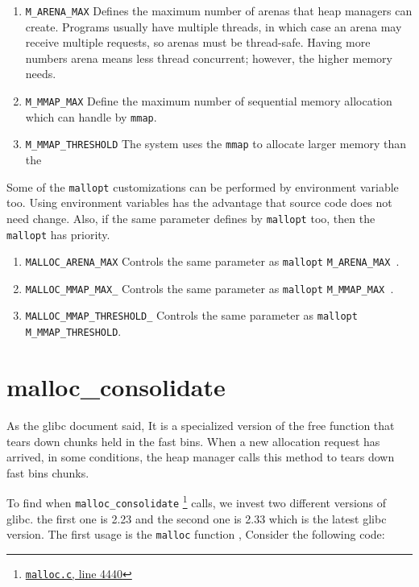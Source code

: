 \documentclass{masterthesis}
\newcommand*\libc{glibc}
\newcommand*\fb{fast bins}
\newcommand*\mallocc{\lstinline{malloc}}
\newcommand*\mmapc{\lstinline{mmap}}
\begin{document}
\begin{enumerate}
\item \lstinline{M_ARENA_MAX} Defines the maximum number of arenas that heap managers can create. Programs usually have multiple threads, in which case an arena may receive multiple requests, so arenas must be thread-safe. Having more numbers arena means less thread concurrent; however, the higher memory needs.

\item \lstinline{M_MMAP_MAX} Define the maximum number of sequential memory allocation which can handle by \mmapc{}.

\item \lstinline{M_MMAP_THRESHOLD} The system uses the \mmapc{} to allocate larger memory than the
\end{enumerate}

Some of the \lstinline{mallopt} customizations can be performed by environment variable too. Using environment variables has the advantage that source code does not need change. Also, if the same parameter defines by \lstinline{mallopt} too, then the \lstinline{mallopt} has priority. 

\begin{enumerate}
\item \lstinline{MALLOC_ARENA_MAX} Controls the same parameter as \lstinline{mallopt} \lstinline{M_ARENA_MAX }.

\item \lstinline{MALLOC_MMAP_MAX_} Controls the same parameter as  \lstinline{mallopt}  \lstinline{M_MMAP_MAX }.

\item \lstinline{MALLOC_MMAP_THRESHOLD_} Controls the same parameter as \lstinline{mallopt} \lstinline{M_MMAP_THRESHOLD}.
\end{enumerate}

\section{malloc\_consolidate}
As the \libc{} document said, It is a specialized version of the free function that tears down chunks held in the \fb{}. When a new allocation request has arrived, in some conditions, the heap manager calls this method to tears down \fb{} chunks.

To find when \lstinline{malloc_consolidate} \footnote{\href{https://sourceware.org/git/?p=glibc.git;a=blob;f=malloc/malloc.c;h=f7cd29bc2f93e1082ee77800bd64a4b2a2897055;hb=9ea3686266dca3f004ba874745a4087a89682617\#l4440}{\texttt{malloc.c}, line 4440}} calls, we invest two different versions of \libc{}. the first one is 2.23 and the second one is 2.33 which is the latest \libc{} version. The first usage is the \mallocc{} function , Consider the following code:
\end{document}
